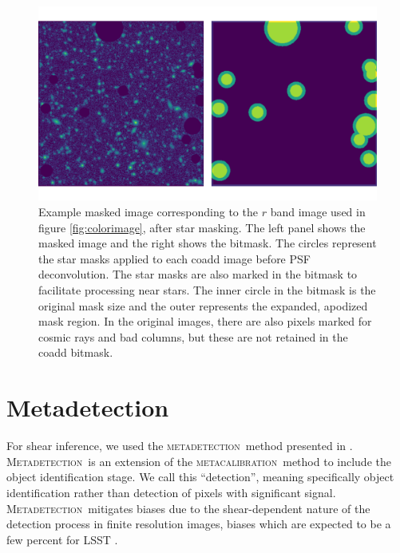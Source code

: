 \documentclass[twocolumn,twocolappendix,astrosym]{openjournal}
\newcommand{\mcal}{\textsc{metacalibration}}
\newcommand{\mdet}{\textsc{metadetection}}
\newcommand{\Mdet}{\textsc{Metadetection}}
\begin{document}
\begin{figure}
    \includegraphics[width=\columnwidth]{example-masked-image.pdf}
    \caption{
        Example masked image corresponding to the $r$ band image used in figure
        \ref{fig:colorimage}, after star masking.  The left panel shows the
        masked image and the right shows the bitmask.  The circles represent
        the star masks applied to each coadd image before PSF deconvolution.
        The star masks are also marked in the bitmask to facilitate processing
        near stars.  The inner circle in the bitmask is the original mask size
        and the outer represents the expanded, apodized mask region.  In the
        original images, there are also pixels marked for cosmic rays and bad
        columns, but these are not retained in the coadd bitmask.
    } \label{fig:maskimage}
\end{figure}

\section{Metadetection} \label{sec:mdet}

For shear inference, we used the \mdet\ method presented in \cite{mdet20}.
\Mdet\ is an extension of the \mcal\ method
\citep{HuffMcal2017,SheldonMcal2017} to include the object identification
stage. We call this ``detection'', meaning specifically object identification
rather than detection of pixels with significant signal. \Mdet\ mitigates
biases due to the shear-dependent nature of the detection process in finite
resolution images, biases which are expected to be a few percent for LSST
\citep{mdet20}.
\end{document}
